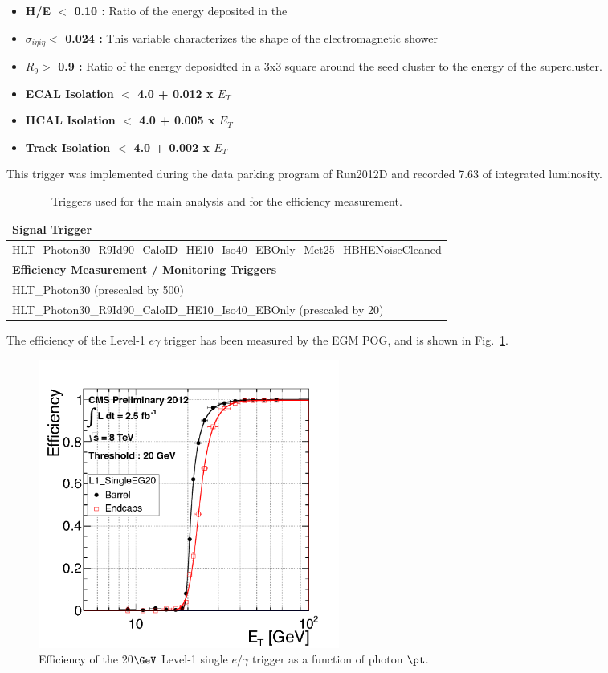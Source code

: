 \begin{itemize}

\item {\bf H/E $<$ 0.10 :} Ratio of the energy deposited in the 
\item {\bf $\sigma_{i{\eta}i{\eta}} <$ 0.024 :} This variable characterizes the shape of the electromagnetic shower
\item {\bf $R_9 >$ 0.9 :} Ratio of the energy deposidted in a 3x3 square around the seed cluster to the energy of the supercluster.
\item {\bf ECAL Isolation $<$ 4.0 + 0.012 x $E_{T}$} 
\item {\bf HCAL Isolation $<$ 4.0 + 0.005 x $E_{T}$} 
\item {\bf Track Isolation $<$ 4.0 + 0.002 x $E_{T}$} 

\end{itemize} 

This trigger was implemented during the data parking program of Run2012D and recorded 7.63 \fbinv of integrated luminosity.

\begin{table}[!htbp]
\caption{ Triggers used for the main analysis and for the efficiency measurement.}
\begin{center}
\begin{tabular}{|l|}
\hline
{\bf Signal Trigger} \\ \hline
HLT\_Photon30\_R9Id90\_CaloID\_HE10\_Iso40\_EBOnly\_Met25\_HBHENoiseCleaned \\ \hline \hline
{\bf Efficiency Measurement / Monitoring Triggers} \\ \hline
HLT\_Photon30 (prescaled by 500) \\
HLT\_Photon30\_R9Id90\_CaloID\_HE10\_Iso40\_EBOnly (prescaled by 20) \\
\hline
\end{tabular}
\label{tab:triggers}
\end{center}
\end{table}

The efficiency of the Level-1 $e\gamma$ trigger has been measured by the EGM POG, and is shown in Fig.~\ref{fig:l1eff}. 


\begin{figure}[htb]
  \begin{center}
    \includegraphics[width=0.48\textwidth,angle=0]{analysis_figs/EGEffVsPt.png}
    \caption{Efficiency of the 20$\GeV$ Level-1 single $e/\gamma$ trigger as a function of photon $\pt$.}
    \label{fig:l1eff}
  \end{center}
\end{figure}

